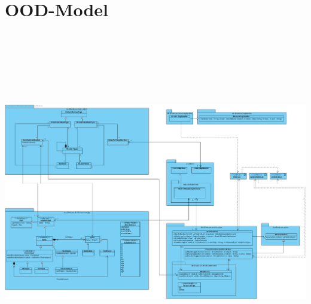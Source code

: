 \documentclass[a4paper,12pt]{report}
\begin{document}
  \section{OOD-Model}  
  \includegraphics[height=15cm,angle=90]{img/ood.png}
  
\end{document}
